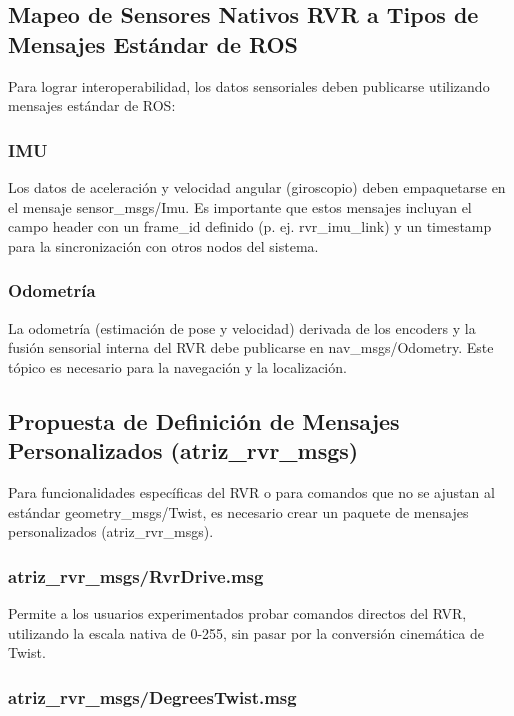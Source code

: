 \documentclass[11pt]{article}
\newcommand{\code}[1]{\textcolor{codeblue}{\url{#1}}}
\numberwithin{figure}{section}
\numberwithin{table}{section}
\def\code#1{#1}%
\begin{document}
\subsection{Mapeo de Sensores Nativos RVR a Tipos de Mensajes Estándar de ROS}

Para lograr interoperabilidad, los datos sensoriales deben publicarse utilizando mensajes estándar de ROS:


\subsubsection{IMU}

Los datos de aceleración y velocidad angular (giroscopio) deben empaquetarse en el mensaje \code{sensor\_msgs/Imu}. Es importante que estos mensajes incluyan el campo header con un \code{frame\_id} definido (p. ej. \code{rvr\_imu\_link}) y un timestamp para la sincronización con otros nodos del sistema.


\subsubsection{Odometría}

La odometría (estimación de pose y velocidad) derivada de los encoders y la fusión sensorial interna del RVR debe publicarse en \code{nav\_msgs/Odometry}. Este tópico es necesario para la navegación y la localización.


\subsection{Propuesta de Definición de Mensajes Personalizados (\code{atriz\_rvr\_msgs})}
\label{sec:mensajes_personalizados}

Para funcionalidades específicas del RVR o para comandos que no se ajustan al estándar \code{geometry\_msgs/Twist}, es necesario crear un paquete de mensajes personalizados (\code{atriz\_rvr\_msgs}).


\subsubsection{atriz\_rvr\_msgs/RvrDrive.msg}

Permite a los usuarios experimentados probar comandos directos del RVR, utilizando la escala nativa de 0-255, sin pasar por la conversión cinemática de Twist.


\subsubsection{atriz\_rvr\_msgs/DegreesTwist.msg}
\end{document}
